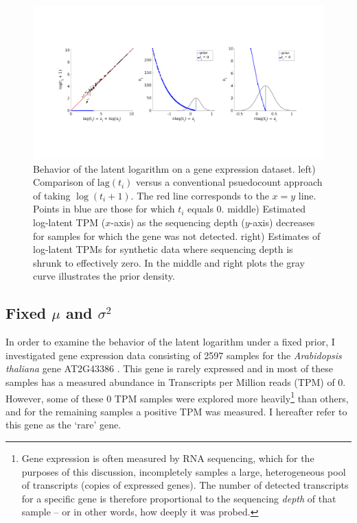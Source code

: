 \documentclass[11pt]{article}
\begin{document}
\begin{figure}[t!]
\centering
\includegraphics[trim={1cm 6cm 1cm 7cm},clip,width=\textwidth]{figure1.png}
\caption{Behavior of the latent logarithm on a gene expression dataset. left) Comparison of $\textrm{lag}(t_i)$ versus a conventional psuedocount approach of taking $\log(t_i + 1)$. The red line corresponds to the $x = y$ line. Points in blue are those for which $t_i$ equals 0. middle) Estimated log-latent TPM ($x$-axis) as the sequencing depth ($y$-axis) decreases for samples for which the gene was not detected. right) Estimates of log-latent TPMs for synthetic data where sequencing depth is shrunk to effectively zero. In the middle and right plots the gray curve illustrates the prior density.}
\end{figure}

\subsection{Fixed $\mu$ and $\sigma^2$}
In order to examine the behavior of the latent logarithm under a fixed prior, I investigated gene expression data consisting of 2597 samples for the \emph{Arabidopsis thaliana} gene AT2G43386 \cite{Biswas2016}. This gene is rarely expressed and in most of these samples has a measured abundance in Transcripts per Million reads (TPM) of 0. However, some of these 0 TPM samples were explored more heavily\footnote[3]{Gene expression is often measured by RNA sequencing, which for the purposes of this discussion, incompletely samples a large, heterogeneous pool of transcripts (copies of expressed genes). The number of detected transcripts for a specific gene is therefore proportional to the sequencing \emph{depth} of that sample -- or in other words, how deeply it was probed.} than others, and for the remaining samples a positive TPM was measured. I hereafter refer to this gene as the `rare' gene.
\end{document}
